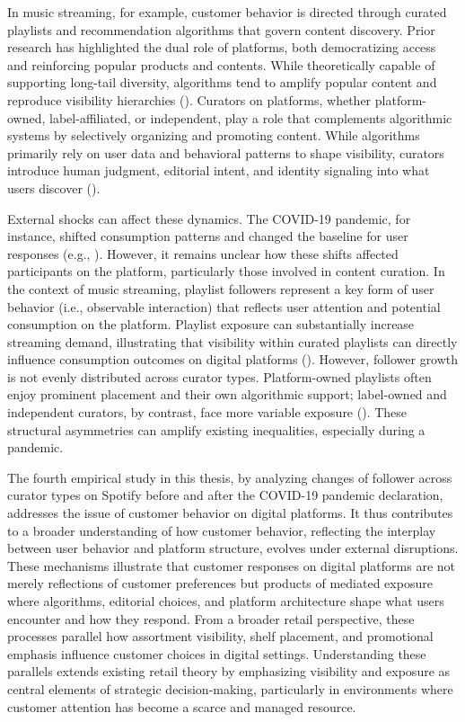 In music streaming, for example, customer behavior is directed through curated playlists and recommendation algorithms that govern content discovery. Prior research has highlighted the dual role of platforms, both democratizing access and reinforcing popular products and contents. While theoretically capable of supporting long-tail diversity, algorithms tend to amplify popular content and reproduce visibility hierarchies (\cite{Aguiar2021-ju, Anderson2006-ts,Bar-Isaac2012-nv}). Curators on platforms, whether platform-owned, label-affiliated, or independent, play a role that complements algorithmic systems by selectively organizing and promoting content. While algorithms primarily rely on user data and behavioral patterns to shape visibility, curators introduce human judgment, editorial intent, and identity signaling into what users discover (\cite{Pachali2025-hk}).

External shocks can affect these dynamics. The COVID-19 pandemic, for instance, shifted consumption patterns and changed the baseline for user responses (e.g., \cite{Sim2022-ns}). However, it remains unclear how these shifts affected participants on the platform, particularly those involved in content curation. In the context of music streaming, playlist followers represent a key form of user behavior (i.e., observable interaction) that reflects user attention and potential consumption on the platform. Playlist exposure can substantially increase streaming demand, illustrating that visibility within curated playlists can directly influence consumption outcomes on digital platforms (\cite{Wlomert2025-ze}). However, follower growth is not evenly distributed across curator types. Platform-owned playlists often enjoy prominent placement and their own algorithmic support; label-owned and independent curators, by contrast, face more variable exposure (\cite{Aguiar2021-ju, Pachali2025-hk}). These structural asymmetries can amplify existing inequalities, especially during a pandemic.

The fourth empirical study in this thesis, by analyzing changes of follower across curator types on Spotify before and after the COVID-19 pandemic declaration, addresses the issue of customer behavior on digital platforms. It thus contributes to a broader understanding of how customer behavior, reflecting the interplay between user behavior and platform structure, evolves under external disruptions. These mechanisms illustrate that customer responses on digital platforms are not merely reflections of customer preferences but products of mediated exposure where algorithms, editorial choices, and platform architecture shape what users encounter and how they respond. From a broader retail perspective, these processes parallel how assortment visibility, shelf placement, and promotional emphasis influence customer choices in digital settings. Understanding these parallels extends existing retail theory by emphasizing visibility and exposure as central elements of strategic decision-making, particularly in environments where customer attention has become a scarce and managed resource.

